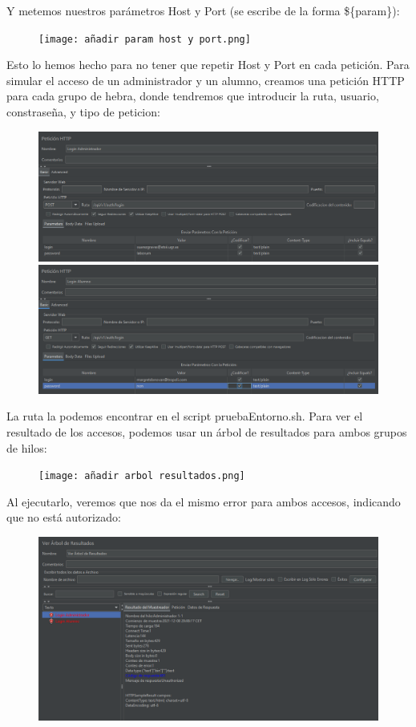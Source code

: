 \documentclass[a4paper]{article}
\begin{document}
Y metemos nuestros parámetros Host y Port (se escribe de la forma \$\{param\}):
\begin{figure}[hbt!]
    \texttt{[image: añadir param host y port.png]}
\end{figure}
\newline Esto lo hemos hecho para no tener que repetir Host y Port en cada petición.
Para simular el acceso de un administrador y un alumno, creamos una petición HTTP para
cada grupo de hebra, donde tendremos que introducir la ruta, usuario, constraseña, y tipo de peticion:
\begin{figure}[hbt!]
    \includegraphics[width=\textwidth]{login administrador.png}
    \includegraphics[width=\textwidth]{login alumno.png}
\end{figure}
\newpage
La ruta la podemos encontrar en el script pruebaEntorno.sh.
Para ver el resultado de los accesos, podemos usar un árbol de resultados para ambos
grupos de hilos:
\begin{figure}[hbt!]
    \texttt{[image: añadir arbol resultados.png]}
\end{figure}
\newline Al ejecutarlo, veremos que nos da el mismo error para ambos accesos, indicando 
que no está autorizado:
\begin{figure}[hbt!]
    \includegraphics[width=\textwidth]{errores arbol resultados.png}
\end{figure}
\end{document}
